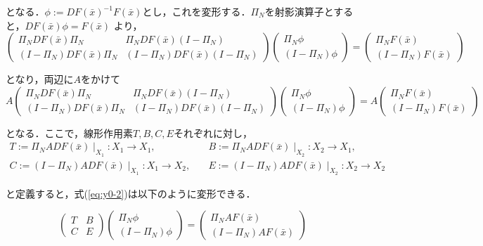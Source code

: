 \documentclass[11pt,a4paper]{jsarticle}
\theoremstyle{definition}
\begin{document}
となる．$\phi:=DF(\bar{x})^{-1} F(\bar{x})$とし，これを変形する．$\Pi_N$を射影演算子とすると，$DF(\bar{x}) \phi = F(\bar{x})$  より，
\begin{equation}
    \begin{pmatrix}
      \Pi_N DF(\bar{x}) \Pi_N & \Pi_N DF(\bar{x}) (I-\Pi_N) \\
      (I-\Pi_N) DF(\bar{x}) \Pi_N & (I-\Pi_N) DF(\bar{x}) (I-\Pi_N)
    \end{pmatrix}
    \begin{pmatrix}
      \Pi_N \phi \\
      (I-\Pi_N) \phi
    \end{pmatrix}
    =
    \begin{pmatrix}
      \Pi_N F(\bar{x}) \\
      (I - \Pi_N) F(\bar{x})
    \end{pmatrix}
\end{equation}

となり，両辺に$A$をかけて
\begin{equation}
  A
  \begin{pmatrix}
    \Pi_N DF(\bar{x}) \Pi_N & \Pi_N DF(\bar{x}) (I-\Pi_N) \\
    (I-\Pi_N) DF(\bar{x}) \Pi_N & (I-\Pi_N) DF(\bar{x}) (I-\Pi_N)
  \end{pmatrix}
  \begin{pmatrix}
    \Pi_N \phi \\
    (I-\Pi_N) \phi
  \end{pmatrix}
  =A
  \begin{pmatrix}
    \Pi_N F(\bar{x}) \\
    (I - \Pi_N) F(\bar{x})
  \end{pmatrix}
  \label{eq:y0-2}
\end{equation}

となる．ここで，線形作用素$T,B,C,E$それぞれに対し，
\begin{equation}
  \begin{split}
    T:= \Pi_N ADF(\bar{x}) \mid _{X_1}:X_1 \rightarrow X_1,\quad &
    B:= \Pi_N ADF(\bar{x}) \mid _{X_2}:X_2 \rightarrow X_1, \\
    C:= (I-\Pi_N) ADF(\bar{x}) \mid _{X_1}:X_1 \rightarrow X_2,\quad &
    E:= (I-\Pi_N) ADF(\bar{x}) \mid _{X_2}:X_2 \rightarrow X_2
  \end{split}
\end{equation}

と定義すると，式(\ref{eq:y0-2})は以下のように変形できる．

\begin{equation}
  \begin{pmatrix}
    T & B \\
    C & E
  \end{pmatrix}
  \begin{pmatrix}
    \Pi_N \phi \\
    (I -\Pi_N) \phi
  \end{pmatrix}
  =
  \begin{pmatrix}
    \Pi_N A F(\bar{x}) \\
    (I - \Pi_N) A F(\bar{x})
  \end{pmatrix}
\end{equation}
\end{document}
